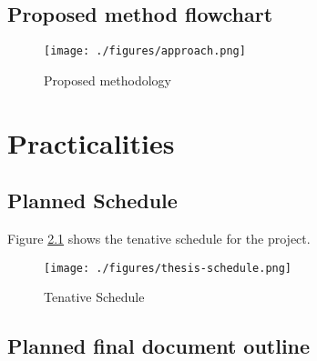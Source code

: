 \section{Proposed method flowchart}
\begin{figure}
      \centering
      \texttt{[image: ./figures/approach.png]}
      \caption{Proposed methodology}
      \label{method-flowchart}
\end{figure}

\chapter{Practicalities}

\section{Planned Schedule}

Figure \ref{project-schedule} shows the tenative schedule for the project. 
\begin{landscape}

      \begin{figure}
            \centering
            \texttt{[image: ./figures/thesis-schedule.png]}
            \caption{Tenative Schedule}
            \label{project-schedule}
      \end{figure}

\end{landscape}
\section{Planned final document outline}
